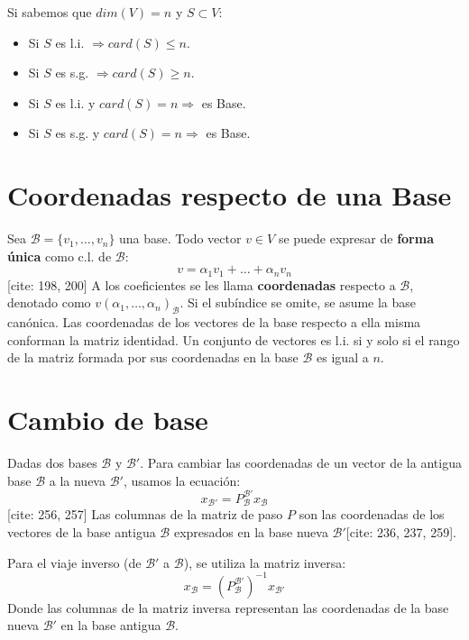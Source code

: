 \documentclass[12pt,a4paper]{article}
\begin{document}
Si sabemos que $dim(V)=n$ y $S \subset V$:
\begin{itemize}
    \item Si $S$ es l.i. $\Rightarrow card(S) \leq n$.
    \item Si $S$ es s.g. $\Rightarrow card(S) \geq n$.
    \item Si $S$ es l.i. y $card(S)=n \Rightarrow$ es Base.
    \item Si $S$ es s.g. y $card(S)=n \Rightarrow$ es Base.
\end{itemize}

\section{Coordenadas respecto de una Base}
Sea $\mathcal{B}=\{v_1, \dots, v_n\}$ una base. Todo vector $v \in V$ se puede expresar de \textbf{forma única} como c.l. de $\mathcal{B}$:
$$v = \alpha_1 v_1 + \dots + \alpha_n v_n$$ [cite: 198, 200]
A los coeficientes se les llama \textbf{coordenadas} respecto a $\mathcal{B}$, denotado como $v(\alpha_1, \dots, \alpha_n)_{\mathcal{B}}$. Si el subíndice se omite, se asume la base canónica. Las coordenadas de los vectores de la base respecto a ella misma conforman la matriz identidad.
Un conjunto de vectores es l.i. si y solo si el rango de la matriz formada por sus coordenadas en la base $\mathcal{B}$ es igual a $n$.

\section{Cambio de base}
Dadas dos bases $\mathcal{B}$ y $\mathcal{B}'$. 
Para cambiar las coordenadas de un vector de la antigua base $\mathcal{B}$ a la nueva $\mathcal{B}'$, usamos la ecuación:
$$x_{\mathcal{B}'} = P_{\mathcal{B}}^{\mathcal{B}'} x_{\mathcal{B}}$$ [cite: 256, 257]
Las columnas de la matriz de paso $P$ son las coordenadas de los vectores de la base antigua $\mathcal{B}$ expresados en la base nueva $\mathcal{B}'$[cite: 236, 237, 259].

Para el viaje inverso (de $\mathcal{B}'$ a $\mathcal{B}$), se utiliza la matriz inversa:
$$x_{\mathcal{B}} = (P_{\mathcal{B}}^{\mathcal{B}'})^{-1} x_{\mathcal{B}'}$$ 
Donde las columnas de la matriz inversa representan las coordenadas de la base nueva $\mathcal{B}'$ en la base antigua $\mathcal{B}$.
\end{document}
